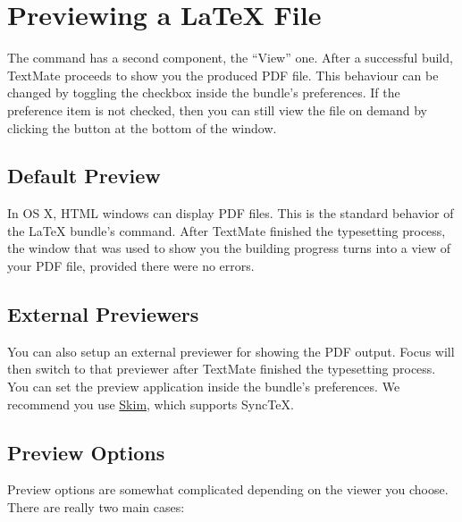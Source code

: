 \documentclass[11pt, x11names]{article}
\begin{document}
\section{Previewing a LaTeX File}

The  command has a second component, the “View” one. After a successful build, TextMate proceeds to show you the produced PDF file. This behaviour can be changed by toggling the checkbox  inside the bundle's preferences. If the preference item is not checked, then you can still view the file on demand by clicking the  button at the bottom of the  window.

\subsection{Default Preview}

In OS X, HTML windows can display PDF files. This is the standard behavior of the LaTeX bundle's  command. After TextMate finished the typesetting process, the window that was used to show you the building progress turns into a view of your PDF file, provided there were no errors.

\subsection{External Previewers}

You can also setup an external previewer for showing the PDF output. Focus will then switch to that previewer after TextMate finished the typesetting process. You can set the preview application inside the bundle's preferences. We recommend you use \href{http://skim-app.sourceforge.net}{Skim}, which supports SyncTeX.

\subsection{Preview Options}

Preview options are somewhat complicated depending on the viewer you choose. There are really two main cases:
\end{document}
